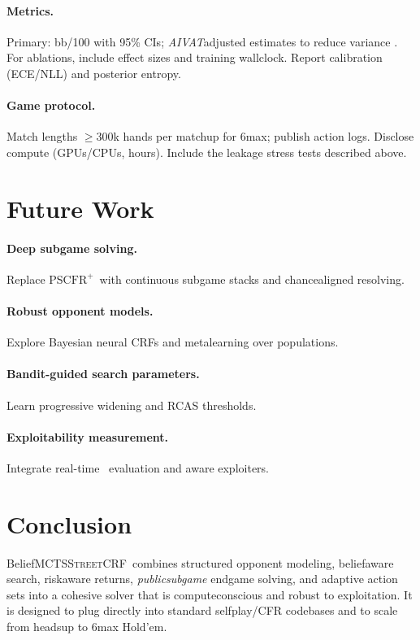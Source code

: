\documentclass[10pt]{article}
\newcommand{\sCRF}{\textsc{Street\textendash CRF}\xspace} %
\newcommand{\CFRplus}{\ensuremath{\mathrm{CFR}^{+}}\xspace}
\newcommand{\CVaR}{\mathrm{CVaR}}
\newcommand{\BR}{\mathrm{BR}}
\newcommand{\1}{\mathbf{1}}
\theoremstyle{plain}
\begin{document}
\paragraph{Metrics.} Primary: bb/100 with 95\% CIs; \emph{AIVAT}\textendash adjusted estimates to reduce variance \citep{burch2018aivat}. For ablations, include effect sizes and training wall\textendash clock. Report calibration (ECE/NLL) and posterior entropy.

\paragraph{Game protocol.} Match lengths $\ge 300$k hands per matchup for 6\textendash max; publish action logs. Disclose compute (GPUs/CPUs, hours). Include the leakage stress tests described above.

\section{Future Work}
\paragraph{Deep subgame solving.} Replace PS\textendash \CFRplus\ with continuous subgame stacks and chance\textendash aligned re\textendash solving.

\paragraph{Robust opponent models.} Explore Bayesian neural CRFs and meta\textendash learning over populations.

\paragraph{Bandit-guided search parameters.} Learn progressive widening and RCAS thresholds.

\paragraph{Exploitability measurement.} Integrate real-time \BR\ evaluation and \CVaR\-aware exploiters.

\section{Conclusion}
Belief\textendash MCTS\textendash \sCRF\ combines structured opponent modeling, belief\textendash aware search, risk\textendash aware returns, \emph{public\textendash subgame} endgame solving, and adaptive action sets into a cohesive solver that is compute\textendash conscious and robust to exploitation. It is designed to plug directly into standard self\textendash play/CFR codebases and to scale from heads\textendash up to 6\textendash max Hold'em.
\end{document}
